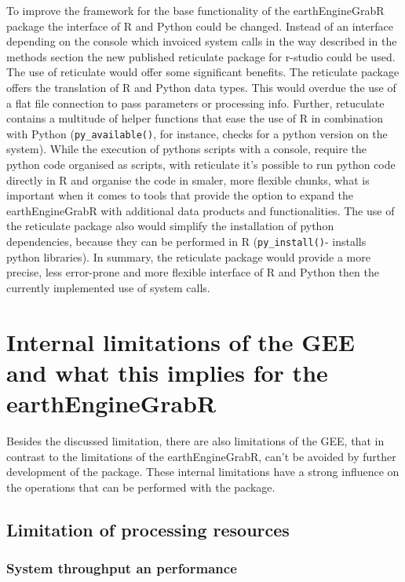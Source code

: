 \documentclass[11pt,twoside,a4paper,final]{report}
\begin{document}
To improve the framework for the base functionality of the earthEngineGrabR package the interface of R and Python could be changed. Instead of an interface depending on the console which invoiced system calls in the way described in the methods section the new published reticulate package for r-studio could be used. The use of reticulate would offer some significant benefits. The reticulate package offers the translation of R and Python data types. This would overdue the use of a flat file connection to pass parameters or processing info. Further, retuculate contains a multitude of helper functions that ease the use of R in combination with Python (\texttt{py\_available()}, for instance, checks for a python version on the system). While the execution of pythons scripts with a console, require the python code organised as scripts, with reticulate it's possible to run python code directly in R and organise the code in smaler, more flexible chunks, what is important when it comes to tools that provide the option to expand the earthEngineGrabR with additional data products and functionalities. The use of the reticulate package also would simplify the installation of python dependencies, because they can be performed in R (\texttt{py\_install()}- installs python libraries).
In summary, the reticulate package would provide a more precise, less error-prone and more flexible interface of R and Python then the currently implemented use of system calls.

\section{Internal limitations of the GEE and what this implies for the earthEngineGrabR}

Besides the discussed limitation, there are also limitations of the GEE, that in contrast to the limitations of the earthEngineGrabR, can't be avoided by further development of the package. These internal limitations have a strong influence on the operations that can be performed with the package. 

\subsection{Limitation of processing resources}


\subsubsection{System throughput an performance}
\end{document}

